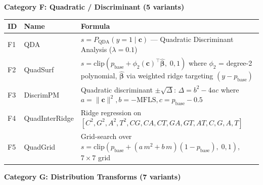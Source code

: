 \documentclass[
  11pt,
]{article}
\newcounter{none} %
\begin{document}
\textbf{Category F: Quadratic / Discriminant (5 variants)}

{\def\LTcaptype{none} %
\begin{longtable}[]{@{}
  >{\raggedright\arraybackslash}p{}
  >{\raggedright\arraybackslash}p{}
  >{\raggedright\arraybackslash}p{}@{}}
\toprule\noalign{}
\begin{minipage}[b]{\linewidth}\raggedright
ID
\end{minipage} & \begin{minipage}[b]{\linewidth}\raggedright
Name
\end{minipage} & \begin{minipage}[b]{\linewidth}\raggedright
Formula
\end{minipage} \\
\midrule\noalign{}
\endhead
\bottomrule\noalign{}
\endlastfoot
F1 & QDA & \(s = P_{\text{QDA}}(y=1 \mid \mathbf{c})\) — Quadratic
Discriminant Analysis (\(\lambda=0.1\)) \\
F2 & QuadSurf &
\(s = \text{clip}(p_{\text{base}} + \phi_2(\mathbf{c})^\top\hat{\boldsymbol{\beta}},\; 0, 1)\)
where \(\phi_2\) = degree-2 polynomial, \(\hat{\boldsymbol{\beta}}\) via
weighted ridge targeting \((y - p_{\text{base}})\) \\
F3 & DiscrimPM & Quadratic discriminant \(\pm\sqrt{\Delta}\):
\(\Delta = b^2 - 4ac\) where
\(a=\|\mathbf{c}\|^2, b=-\text{MFLS}, c=p_{\text{base}}-0.5\) \\
F4 & QuadInterRidge & Ridge regression on
\([C^2, G^2, A^2, T^2, CG, CA, CT, GA, GT, AT, C, G, A, T]\) \\
F5 & QuadGrid & Grid-search over
\(s = \text{clip}(p_{\text{base}} + (a\,m^2 + b\,m)(1-p_{\text{base}}),\; 0, 1)\),
\(7\times7\) grid \\
\end{longtable}
}

\textbf{Category G: Distribution Transforms (7 variants)}
\end{document}
